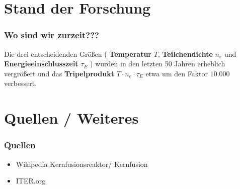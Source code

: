 \documentclass[aspectratio=169]{beamer}
\begin{document}

  \section{Stand der Forschung}

    \begin{frame}
      \frametitle{Wo sind wir zurzeit???}

      Die drei entscheidenden Größen ( \textbf{Temperatur} \( T \), \textbf{Teilchendichte} \( n_e \)
      und \textbf{Energieeinschlusszeit} \( \tau_E \) ) wurden in den letzten 50 Jahren
      erheblich vergrößert und das \textbf{Tripelprodukt} \( T \cdot n_e \cdot \tau_E \)
      etwa um den Faktor 10.000 verbessert.

    \end{frame}

  \section{Quellen / Weiteres}

    \begin{frame}
      \frametitle{Quellen}
      \begin{itemize}
        \item Wikipedia Kernfusionsreaktor/ Kernfusion
        \item ITER.org 
      \end{itemize}
    \end{frame}
\end{document}
